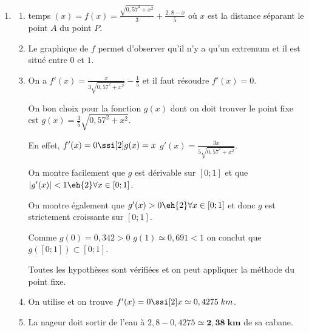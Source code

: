 \begin{enumerate}[label=R4.\arabic*, font=\bfseries, itemsep=8mm,labelsep*=4mm]
\begin{enumerate}[label=\alph*),itemsep=4mm,start=2]
\begin{enumerate}[label=\roman*),itemsep=3mm]
\smallskip
Toutes les hypothèses du théorème de convergence du point fixe sont vérifiées.
\item \textbf{Méthode du Point Fixe :} Il faut \textbf{10 étapes}
\end{enumerate}
\end{enumerate}




\item\begin{enumerate}[label=\roman*),itemsep=4mm,left=-2mm, labelsep*=2mm]
\item
temps $(x)=f(x)=\frac{\sqrt{0,57^2+x^2}}{3}+\frac{2,8-x}{5}$ où $x$ est la distance séparant le point $A$ du point $P$.

\setcounter{enumii}{2}
\item
Le graphique de $f$ permet d'observer qu'il n'y a qu'un extremum et il est situé entre $0$ et $1$.

\item
On a $f'(x)=\frac{x}{3\sqrt{0,57^2+x^2}}-\frac{1}{5}$ et il faut résoudre $f'(x)=0$.

On bon choix pour la fonction $g(x)$ dont on doit trouver le point fixe est $g(x)=\frac{3}{5}\sqrt{0,57^2+x^2}$.

En effet, $f'(x)=0 \ssi[2] g(x)=x$  $g'(x)=\frac{3x}{5\sqrt{0,57^2+x^2}}$.

\smallskip
On montre facilement que $g$ est dérivable sur $[0;1]$ et que $\vert g'(x)\vert <1 \eh{2}\forall x\in [0;1]$.

\smallskip
On montre également que $g'(x)>0 \eh{2}\forall x\in [0;1]$ et donc $g$ est strictement croissante sur $[0;1]$.

\smallskip
Comme $g(0)=0,342>0$  $g(1)\simeq 0,691<1$ on conclut que $g([0;1])\subset [0;1]$.

\smallskip
Toutes les hypothèses sont vérifiées et on peut appliquer la méthode du point fixe.

\item
On utilise  et on trouve $f'(x)=0 \ssi[2] x\simeq 0,4275\; km$.

\item
La nageur doit sortir de l'eau à $2,8-0,4275\simeq \bm{2,38\;km}$ de sa cabane.

\end{enumerate}

\end{enumerate}










